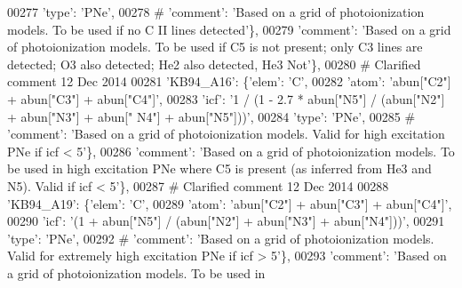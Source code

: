 \begin{DoxyCode}
00277                                       \textcolor{stringliteral}{'type'}: \textcolor{stringliteral}{'PNe'},
00278 \textcolor{comment}{#                                     'comment': 'Based on a grid of photoionization models. To be used if
       no C II lines detected'\},}
00279                                       \textcolor{stringliteral}{'comment'}: \textcolor{stringliteral}{'Based on a grid of photoionization models. To be used if
       C5 is not present; only C3 lines are detected; O3 also detected; He2 also detected, He3 Not'}\},
00280 \textcolor{comment}{# Clarified comment 12 Dec 2014}
00281                          \textcolor{stringliteral}{'KB94\_A16'}: \{\textcolor{stringliteral}{'elem'}: \textcolor{stringliteral}{'C'},
00282                                       \textcolor{stringliteral}{'atom'}: \textcolor{stringliteral}{'abun["C2"] + abun["C3"] + abun["C4"]'},
00283                                       \textcolor{stringliteral}{'icf'}: \textcolor{stringliteral}{'1 / (1 - 2.7 * abun["N5"] / (abun["N2"] + abun["N3"] + abun["
      N4"] + abun["N5"]))'},
00284                                       \textcolor{stringliteral}{'type'}: \textcolor{stringliteral}{'PNe'},
00285 \textcolor{comment}{#                                     'comment': 'Based on a grid of photoionization models. Valid for high
       excitation PNe if icf < 5'\},}
00286                                        \textcolor{stringliteral}{'comment'}: \textcolor{stringliteral}{'Based on a grid of photoionization models. To be used in
       high excitation PNe where C5 is present (as inferred from He3 and N5). Valid if icf < 5'}\},
00287 \textcolor{comment}{# Clarified comment 12 Dec 2014}
00288                          \textcolor{stringliteral}{'KB94\_A19'}: \{\textcolor{stringliteral}{'elem'}: \textcolor{stringliteral}{'C'},
00289                                       \textcolor{stringliteral}{'atom'}: \textcolor{stringliteral}{'abun["C2"] + abun["C3"] + abun["C4"]'},
00290                                       \textcolor{stringliteral}{'icf'}: \textcolor{stringliteral}{'(1 + abun["N5"] / (abun["N2"] + abun["N3"] + abun["N4"]))'},
00291                                       \textcolor{stringliteral}{'type'}: \textcolor{stringliteral}{'PNe'},
00292 \textcolor{comment}{#                                      'comment': 'Based on a grid of photoionization models. Valid for
       extremely high excitation PNe if icf > 5'\},}
00293                                        \textcolor{stringliteral}{'comment'}: \textcolor{stringliteral}{'Based on a grid of photoionization models. To be used in
}
\end{DoxyCode}
